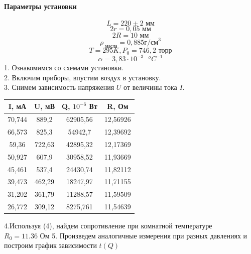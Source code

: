 \documentclass[a4paper]{article}
\begin{document}
	\paragraph*{Параметры установки}
	\begin{equation}
	L=220\pm 2 \text{ мм}
	\end{equation}
	\begin{equation}
	2r = 0,05 \text{ мм}
	\end{equation}
	\begin{equation}
	2R = 10 \text{ мм}
	\end{equation}
	\begin{equation}
	\rho_\text{ масла}=0,885 \text{г/см}^3
	\end{equation}
	\begin{equation}
	T=295 K, P_0=746,2 \text{ торр}
	\end{equation}
	\begin{equation}
	\alpha=3,83\cdot 10^{-3} \text{ }^oC^{-1}
	\end{equation}
	1. Ознакомимся со схемами установки. \\
	2. Включим приборы, впустим воздух в установку. \\
	3. Снимем зависимость напряжения $U$ от величины тока $I$.
	\begin{table}[h!]
 		\centering
    	\begin{tabular}{| c | c | c | c |}
    		\hline
    		I, мА & U, мВ & Q, $10^{-6}$ Вт & R, Ом \\
    		\hline
    		70,744 &	889,2 &	62905,56	&12,56926 \\
    		\hline
66,573 & 825,3 & 	54942,7 & 	12,39692 \\
    		\hline
59,36 & 	722,63 & 	42895,32 & 	12,17369 \\
    		\hline
50,927	 & 607,9	 & 30958,52	 & 11,93669 \\
    		\hline
45,461	 & 537,4	 & 24430,74	 & 11,82112 \\
    		\hline
39,473	 & 462,29	 & 18247,97	 & 11,71155 \\
    		\hline
31,202	 & 361,79	 & 11288,57	 & 11,59509 \\
    		\hline
26,772	 & 309,12	 & 8275,761	 & 11,54639 \\
    		\hline
    	\end{tabular}
	\end{table}
	4.Используя (4), найдем сопротивление при комнатной температуре $R_0 = 11.36 \text{ Ом}$
	5. Произведем аналогичные измерения при разных давлениях и построим график зависимости $t(Q)$
\end{document}
